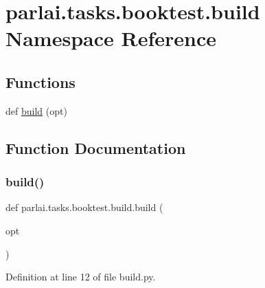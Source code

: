 \hypertarget{namespaceparlai_1_1tasks_1_1booktest_1_1build}{}\section{parlai.\+tasks.\+booktest.\+build Namespace Reference}
\label{namespaceparlai_1_1tasks_1_1booktest_1_1build}
\subsection*{Functions}
\begin{DoxyCompactItemize}
\item 
def \hyperlink{namespaceparlai_1_1tasks_1_1booktest_1_1build_acc4c0b0b235424ab52a434d122d857cc}{build} (opt)
\end{DoxyCompactItemize}


\subsection{Function Documentation}
\mbox{\label{namespaceparlai_1_1tasks_1_1booktest_1_1build_acc4c0b0b235424ab52a434d122d857cc}} 
\subsubsection{\texorpdfstring{build()}{build()}}
{\footnotesize\ttfamily def parlai.\+tasks.\+booktest.\+build.\+build (\begin{DoxyParamCaption}\item[{}]{opt }\end{DoxyParamCaption})}



Definition at line 12 of file build.\+py.

